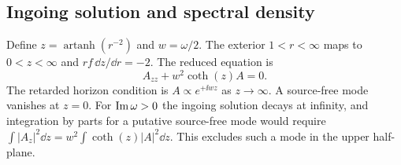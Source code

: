 \subsection{Ingoing solution and spectral density}

Define \(z=\operatorname{artanh}(r^{-2})\) and \(w=\omega/2\). The exterior \(1<r<\infty\) maps to \(0<z<\infty\) and \(r f\,\dd z/\dd r=-2\). The reduced equation is
\begin{equation}
 A_{zz}+w^2\coth(z) A=0.
 \label{eq:lovelock-z}
\end{equation}
The retarded horizon condition is \(A\propto e^{+\ii wz}\) as \(z\to\infty\). A source-free mode vanishes at \(z=0\). For \({\rm Im}\,\omega>0\) the ingoing solution decays at infinity, and integration by parts for a putative source-free mode would require \(\int |A_z|^2\dd z=w^2\int \coth(z)|A|^2\dd z\). This excludes such a mode in the upper half-plane.

